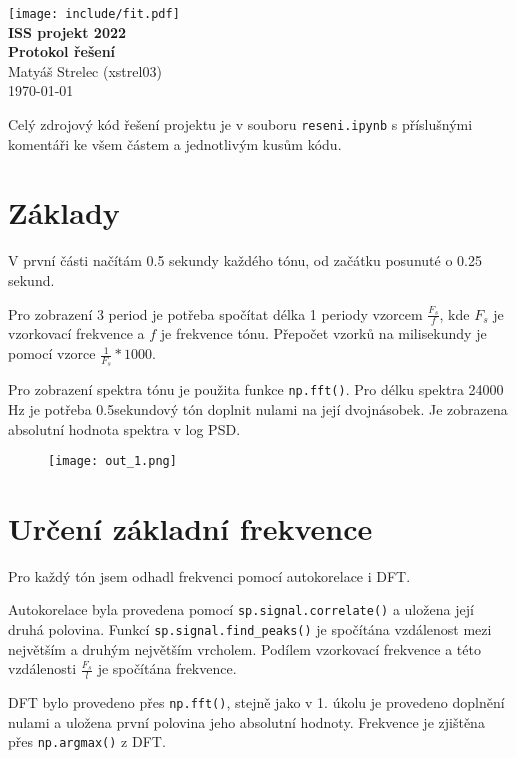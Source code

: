 \documentclass[11pt,a4paper]{article}
\begin{document}
\begin{center}
    \texttt{[image: include/fit.pdf]} \\  
    \textbf{\Large{ISS projekt 2022 \\
    Protokol řešení}} \\
    Matyáš Strelec (xstrel03) \\
    \today
\end{center}

Celý zdrojový kód řešení projektu je v souboru \verb|reseni.ipynb| s příslušnými komentáři ke všem částem a jednotlivým kusům kódu.

\section{Základy}

V první části načítám 0.5 sekundy každého tónu, od začátku posunuté o 0.25 sekund.

Pro zobrazení 3 period je potřeba spočítat délka 1 periody vzorcem $\frac{F_s}{f}$, kde $F_s$ je vzorkovací frekvence a $f$ je frekvence tónu. Přepočet vzorků na milisekundy je pomocí vzorce $\frac{1}{F_s}*1000$.

Pro zobrazení spektra tónu je použita funkce \verb|np.fft()|. Pro délku spektra 24000 Hz je potřeba 0.5sekundový tón doplnit nulami na její dvojnásobek. Je zobrazena absolutní hodnota spektra v log PSD.

\begin{figure}[H]
    \begin{center}
        \texttt{[image: out\_1.png]}
    \end{center}
\end{figure}

\section{Určení základní frekvence}

Pro každý tón jsem odhadl frekvenci pomocí autokorelace i DFT. 

Autokorelace byla provedena pomocí \verb|sp.signal.correlate()| a uložena její druhá polovina. Funkcí \verb|sp.signal.find_peaks()| je spočítána vzdálenost mezi největším a druhým největším vrcholem. Podílem vzorkovací frekvence a této vzdálenosti $\frac{F_s}{l}$ je spočítána frekvence. 

DFT bylo provedeno přes \verb|np.fft()|, stejně jako v 1. úkolu je provedeno doplnění nulami a uložena první polovina jeho absolutní hodnoty. Frekvence je zjištěna přes \verb|np.argmax()| z DFT.
\end{document}
